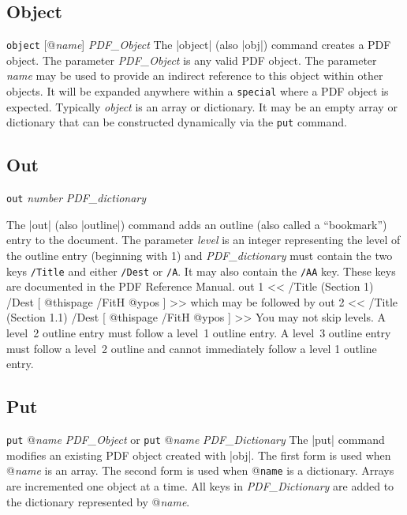 {\subsection{Object}
\syntax
{\tt object} [@{\it name}] {\it PDF\_Object}
\description
The |object| (also |obj|) command creates a
PDF object.  The parameter {\it PDF\_Object} is any valid PDF object.  The
parameter {\it name} may be used to provide an indirect reference
to this object within other
objects. It will be expanded anywhere within
a {\tt special} where a PDF object is
expected. Typically {\it object} is an array
or dictionary.  It may be an empty array or
dictionary that can be constructed dynamically via
the {\tt put} command.
\example
\begintt
{}
\endtt

\subsection{Out}
\syntax
{\tt out} {\it number} {\it PDF\_dictionary}

\description
The |out| (also |outline|) command adds an outline (also called a ``bookmark'') entry
to the document.
The parameter {\it level\/} is an integer representing the
level of the outline entry (beginning with 1) and
{\it  PDF\_dictionary\/} must contain
the two keys {\tt /Title} and either {\tt /Dest} or {\tt /A}.
It may also contain the {\tt /AA} key.  These keys are documented
in the PDF Reference Manual.
\example
\begintt
out 1 << /Title (Section 1) /Dest [ @thispage /FitH @ypos ] >>
\endtt
which may be followed by
\begintt
out 2 << /Title (Section 1.1) /Dest [ @thispage /FitH @ypos ] >>
\endtt
\note
You may not skip levels.  A level~2 outline entry
must follow a level~1 outline
entry.  A level~3 outline entry must follow a level~2 outline
and cannot immediately follow a level 1 outline entry.

\subsection{Put}
\syntax
\beginlist
{\tt put} @{\it name} {\it PDF\_Object}
\endlist
or 
\beginlist
{\tt put} @{\it name} {\it PDF\_Dictionary}
\endlist
\description
The |put| command modifies an existing PDF object created with |obj|.
The first form is used when @{\it name} is an array.  The second
form is used when @{\tt name} is a dictionary.  Arrays are
incremented one object at a time.  All keys in {\it PDF\_Dictionary}
are added to the dictionary represented by @{\it name}.
\example
\begintt
{}
\endtt

}
